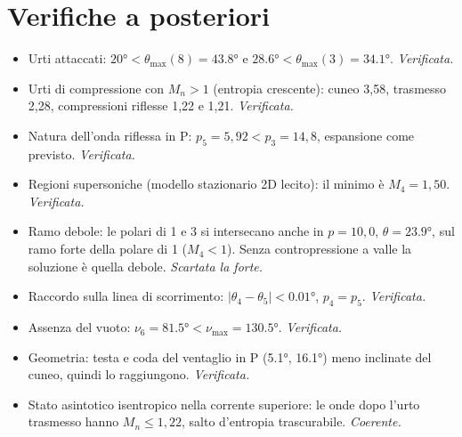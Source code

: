 \documentclass[11pt,a4paper]{article}
\begin{document}
\section{Verifiche a posteriori}
\begin{itemize}
\item Urti attaccati: $\ang{20}<\theta_{\max}(8)=\ang{43.8}$ e $\ang{28.6}<\theta_{\max}(3)=\ang{34.1}$. \emph{Verificata.}
\item Urti di compressione con $M_n>1$ (entropia crescente): cuneo 3,58, trasmesso 2,28, compressioni riflesse
  1,22 e 1,21. \emph{Verificata.}
\item Natura dell'onda riflessa in P: $p_5=5{,}92<p_3=14{,}8$, espansione come previsto. \emph{Verificata.}
\item Regioni supersoniche (modello stazionario 2D lecito): il minimo è $M_4=1{,}50$. \emph{Verificata.}
\item Ramo debole: le polari di 1 e 3 si intersecano anche in $p=10{,}0$, $\theta=\ang{23.9}$, sul ramo forte della
  polare di 1 ($M_4<1$). Senza contropressione a valle la soluzione è quella debole. \emph{Scartata la forte.}
\item Raccordo sulla linea di scorrimento: $|\theta_4-\theta_5|<\ang{0.01}$, $p_4=p_5$. \emph{Verificata.}
\item Assenza del vuoto: $\nu_6=\ang{81.5}<\nu_{\max}=\ang{130.5}$. \emph{Verificata.}
\item Geometria: testa e coda del ventaglio in P (\ang{5.1}, \ang{16.1}) meno inclinate del cuneo, quindi lo
  raggiungono. \emph{Verificata.}
\item Stato asintotico isentropico nella corrente superiore: le onde dopo l'urto trasmesso hanno $M_n\le1{,}22$,
  salto d'entropia trascurabile. \emph{Coerente.}
\end{itemize}

\end{document}
